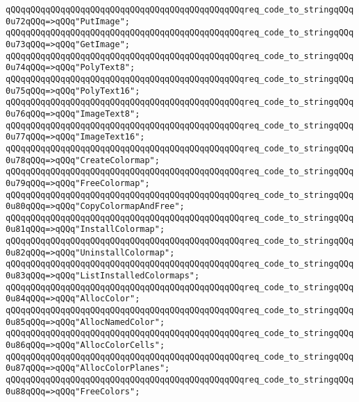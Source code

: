 \verb|qQQqqQQqqQQqqQQqqQQqqQQqqQQqqQQqqQQqqQQqqQQqqQQqreq_code_to_stringqQQq0u72qQQq=>qQQq"PutImage";|\newline
\verb|qQQqqQQqqQQqqQQqqQQqqQQqqQQqqQQqqQQqqQQqqQQqqQQqreq_code_to_stringqQQq0u73qQQq=>qQQq"GetImage";|\newline
\verb|qQQqqQQqqQQqqQQqqQQqqQQqqQQqqQQqqQQqqQQqqQQqqQQqreq_code_to_stringqQQq0u74qQQq=>qQQq"PolyText8";|\newline
\verb|qQQqqQQqqQQqqQQqqQQqqQQqqQQqqQQqqQQqqQQqqQQqqQQqreq_code_to_stringqQQq0u75qQQq=>qQQq"PolyText16";|\newline
\verb|qQQqqQQqqQQqqQQqqQQqqQQqqQQqqQQqqQQqqQQqqQQqqQQqreq_code_to_stringqQQq0u76qQQq=>qQQq"ImageText8";|\newline
\verb|qQQqqQQqqQQqqQQqqQQqqQQqqQQqqQQqqQQqqQQqqQQqqQQqreq_code_to_stringqQQq0u77qQQq=>qQQq"ImageText16";|\newline
\verb|qQQqqQQqqQQqqQQqqQQqqQQqqQQqqQQqqQQqqQQqqQQqqQQqreq_code_to_stringqQQq0u78qQQq=>qQQq"CreateColormap";|\newline
\verb|qQQqqQQqqQQqqQQqqQQqqQQqqQQqqQQqqQQqqQQqqQQqqQQqreq_code_to_stringqQQq0u79qQQq=>qQQq"FreeColormap";|\newline
\verb|qQQqqQQqqQQqqQQqqQQqqQQqqQQqqQQqqQQqqQQqqQQqqQQqreq_code_to_stringqQQq0u80qQQq=>qQQq"CopyColormapAndFree";|\newline
\verb|qQQqqQQqqQQqqQQqqQQqqQQqqQQqqQQqqQQqqQQqqQQqqQQqreq_code_to_stringqQQq0u81qQQq=>qQQq"InstallColormap";|\newline
\verb|qQQqqQQqqQQqqQQqqQQqqQQqqQQqqQQqqQQqqQQqqQQqqQQqreq_code_to_stringqQQq0u82qQQq=>qQQq"UninstallColormap";|\newline
\verb|qQQqqQQqqQQqqQQqqQQqqQQqqQQqqQQqqQQqqQQqqQQqqQQqreq_code_to_stringqQQq0u83qQQq=>qQQq"ListInstalledColormaps";|\newline
\verb|qQQqqQQqqQQqqQQqqQQqqQQqqQQqqQQqqQQqqQQqqQQqqQQqreq_code_to_stringqQQq0u84qQQq=>qQQq"AllocColor";|\newline
\verb|qQQqqQQqqQQqqQQqqQQqqQQqqQQqqQQqqQQqqQQqqQQqqQQqreq_code_to_stringqQQq0u85qQQq=>qQQq"AllocNamedColor";|\newline
\verb|qQQqqQQqqQQqqQQqqQQqqQQqqQQqqQQqqQQqqQQqqQQqqQQqreq_code_to_stringqQQq0u86qQQq=>qQQq"AllocColorCells";|\newline
\verb|qQQqqQQqqQQqqQQqqQQqqQQqqQQqqQQqqQQqqQQqqQQqqQQqreq_code_to_stringqQQq0u87qQQq=>qQQq"AllocColorPlanes";|\newline
\verb|qQQqqQQqqQQqqQQqqQQqqQQqqQQqqQQqqQQqqQQqqQQqqQQqreq_code_to_stringqQQq0u88qQQq=>qQQq"FreeColors";|\newline
